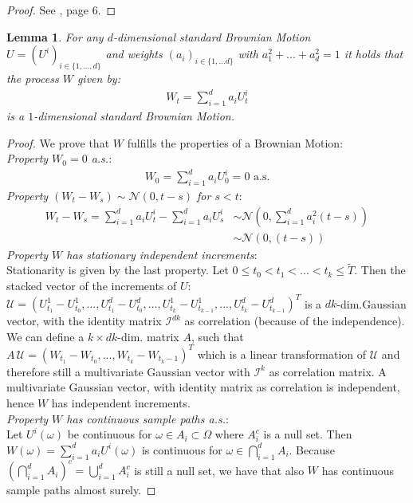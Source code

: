 \documentclass[12pt]{article}
\newtheorem{lemma}[theorem]{Lemma}
\begin{document}
	\begin{proof}
		See \cite{fima2Lecture}, page 6. %
	\end{proof}
	\begin{lemma}\label{lm:linearcombiofbmisbm}
		For any $d$-dimensional standard Brownian Motion $U = (U^i)_{i\in\{1, ..., d\}}$ and weights $(a_i)_{i\in\{1,...d\}}$ with $a^2_1 + ... + a^2_d = 1$ it holds that the process $W$ given by:
		\begin{align*}
			W_t = \sum_{i=1}^{d}a_iU^i_t
		\end{align*}
		is a $1$-dimensional standard Brownian Motion.
	\end{lemma} 
	\begin{proof}
		We prove that $W$ fulfills the properties of a Brownian Motion:\\
		\emph{Property $W_0=0$ a.s.}:
		\begin{align*}
			W_0 = \sum_{i=1}^{d}a_iU^i_0 = 0 \text{ a.s.}
		\end{align*}
		\emph{Property $(W_t-W_s) \sim \mathcal{N}(0, t-s)$ for $s < t$}:
		\begin{align*}
			W_t - W_s = \sum_{i=1}^{d}a_iU^i_t - \sum_{i=1}^{d}a_iU^i_s &\sim \mathcal{N}\left(0, \sum_{i=1}^{d}a^2_i(t-s)\right)\\
			&\sim \mathcal{N}\left(0, (t-s)\right)
		\end{align*}
		\emph{Property $W$ has stationary independent increments}:\\
		Stationarity is given by the last property. Let $0 \le t_0 < t_1 <...<t_k \le \tilde{T}$. Then the stacked vector of the increments of $U$: $\mathcal{U} = (U^1_{t_1} -U^1_{t_0}, ...,U^d_{t_1} -U^d_{t_0}, ..., U^1_{t_k} -U^1_{t_{k-1}}, ..., U^d_{t_k} -U^d_{t_{k-1}})^T$ is a $dk$-dim.\;Gaussian vector, with the identity matrix $\mathcal{I}^{dk}$ as correlation (because of the independence). We can define a $k \times dk$-dim. matrix $A$, such that $A\,\mathcal{U} = (W_{t_1}-W_{t_0}, ..., W_{t_k}-W_{t_k-1})^T$ which is a linear transformation of $\mathcal{U}$ and therefore still a multivariate Gaussian vector with $\mathcal{I}^{k}$ as correlation matrix. A multivariate Gaussian vector, with identity matrix as correlation is independent, hence $W$ has independent increments.
		\\
		\emph{Property $W$ has continuous sample paths a.s.}:\\
		Let $U^i(\omega)$ be continuous for $\omega \in A_i\subset\Omega$ where $A_i^c$ is a null set. Then $W(\omega) = \sum_{i=1}^{d}a_iU^i(\omega)$ is continuous for $\omega \in \bigcap_{i=1}^dA_i$. Because $\left(\bigcap_{i=1}^dA_i\right)^c = \bigcup_{i=1}^dA^c_i$ is still a null set, we have that also $W$ has continuous sample paths almost surely.
	\end{proof}
	
\end{document}
